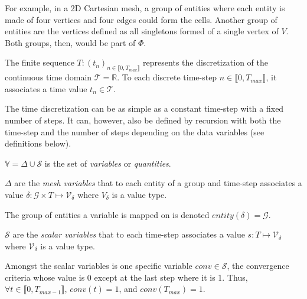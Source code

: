For example, in a 2D Cartesian mesh, a group of entities where each entity is made of four vertices and four edges could form the cells.
Another group of entities are the vertices defined as all singletons formed of a single vertex of $V$. Both groups, then, would be part of $\Phi$.

\medskip

\begin{mydef}
The finite sequence $T: (t_n)_{n\in\llbracket 0, T_{max} \rrbracket}$ represents the discretization of the continuous time domain $\mathcal{T}=\mathbb{R}$.
To each discrete time-step $n\in\llbracket 0, T_{max} \rrbracket$, it associates a time value $t_n\in\mathcal{T}$.
\end{mydef}

The time discretization can be as simple as a constant time-step with a fixed number of steps.
It can, however, also be defined by recursion with both the time-step and the number of steps depending on the data variables (see definitions below).

\medskip

\begin{mydefs}
\item $\mathbb{V}=\Delta\cup\mathcal{S}$ is the set of \emph{variables} or \emph{quantities}.
\item $\Delta$ are the \textit{mesh variables} that to each entity of a group and time-step associates a value $\delta: \mathcal{G}\times T\mapsto \mathcal{V}_\delta$ where $V_{\delta}$ is a value type.
\item The group of entities a variable is mapped on is denoted $entity(\delta)=\mathcal{G}$.
\item $\mathcal{S}$ are the \textit{scalar variables} that to each time-step associates a value $s: T\mapsto \mathcal{V}_\delta$ where $\mathcal{V}_{\delta}$ is a value type.
\item Amongst the scalar variables is one specific variable $conv\in\mathcal{S}$, the convergence criteria whose value is $0$ except at the last step where it is 1. Thus, $\forall t\in \llbracket 0, T_{max-1} \rrbracket$, $conv(t)=1$, and $conv(T_{max})=1$.
\end{mydefs}


